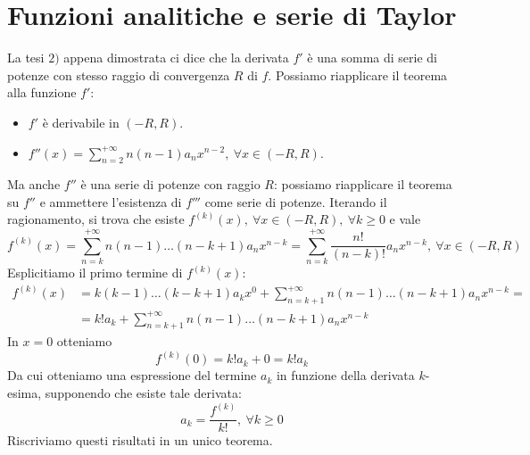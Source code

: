 \section{Funzioni analitiche e serie di Taylor}
La tesi $2)$ appena dimostrata ci dice che la derivata $f'$ è una somma di serie di potenze con stesso raggio di convergenza $R$ di $f$. Possiamo riapplicare il teorema alla funzione $f'$:
\begin{itemize}
	\item $f'$ è derivabile in $\left(-R,R\right)$.
	\item $\displaystyle f''\left(x\right)=\sum_{n=2}^{+\infty}n\left(n-1\right)a_nx^{n-2},\ \forall x\in\left(-R,R\right)$.
\end{itemize}
Ma anche $f''$ è una serie di potenze con raggio $R$: possiamo riapplicare il teorema su $f''$ e ammettere l'esistenza di $f'''$ come serie di potenze. Iterando il ragionamento, si trova che esiste $f^{\left(k\right)}\left(x\right),\ \forall x\in\left(-R,R\right),\ \forall k\geq 0$ e vale
\begin{equation}
	f^{\left(k\right)}\left(x\right)=\sum_{n=k}^{+\infty}n\left(n-1\right)\ldots\left(n-k+1\right)a_nx^{n-k}=\sum_{n=k}^{+\infty}\frac{n!}{\left(n-k\right)!}a_nx^{n-k},\ \forall x\in\left(-R,R\right)
\end{equation}
Esplicitiamo il primo termine di $f^{\left(k\right)}\left(x\right)$:
\begin{align*}
	f^{\left(k\right)}\left(x\right)&=k\left(k-1\right)\ldots\left(k-k+1\right)a_kx^0+\sum_{n=k+1}^{+\infty}n\left(n-1\right)\ldots\left(n-k+1\right)a_nx^{n-k}=\\
	&=k!a_k+\sum_{n=k+1}^{+\infty}n\left(n-1\right)\ldots\left(n-k+1\right)a_nx^{n-k}
\end{align*}
In $x=0$ otteniamo
\begin{equation*}
	f^{\left(k\right)}\left(0\right)=k!a_k+0=k!a_k
\end{equation*}
Da cui otteniamo una espressione del termine $a_k$ in funzione della derivata $k$-esima, supponendo che esiste tale derivata:
\begin{equation}
	a_k=\frac{f^{\left(k\right)}}{k!},\ \forall k\geq 0
\end{equation}
Riscriviamo questi risultati in un unico teorema.
